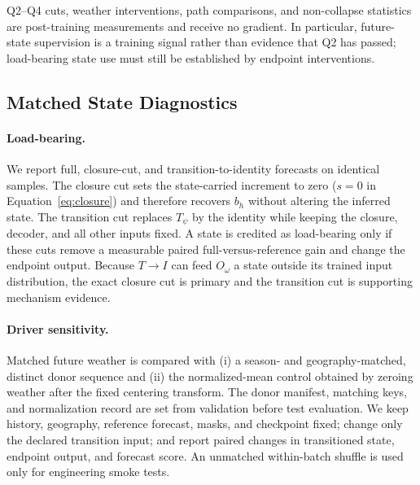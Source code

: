 \documentclass[letterpaper]{article} %
\begin{document}
Q2--Q4 cuts, weather interventions, path comparisons, and non-collapse
statistics are post-training measurements and receive no gradient. In
particular, future-state supervision is a training signal rather than evidence
that Q2 has passed; load-bearing state use must still be established by
endpoint interventions.

\subsection{Matched State Diagnostics}

\paragraph{Load-bearing.}
We report full, closure-cut, and transition-to-identity forecasts on identical
samples. The closure cut sets the state-carried increment to zero
($s=0$ in Equation~\ref{eq:closure}) and therefore recovers $b_h$ without
altering the inferred state. The transition cut replaces $T_\psi$ by the
identity while keeping the closure, decoder, and all other inputs fixed. A state
is credited as load-bearing only if these cuts remove a measurable paired
full-versus-reference gain and change the endpoint output. Because
$T\!\rightarrow I$ can feed $O_\omega$ a state outside its trained input
distribution, the exact closure cut is primary and the transition cut is
supporting mechanism evidence.

\paragraph{Driver sensitivity.}
Matched future weather is compared with (i) a season- and geography-matched,
distinct donor sequence and (ii) the normalized-mean control obtained by
zeroing weather after the fixed centering transform. The donor manifest,
matching keys, and normalization record are set from validation before test evaluation. We
keep history, geography, reference forecast, masks, and checkpoint fixed;
change only the declared transition input; and report paired changes in
transitioned state, endpoint output, and forecast score. An unmatched
within-batch shuffle is used only for engineering smoke tests.
\end{document}
